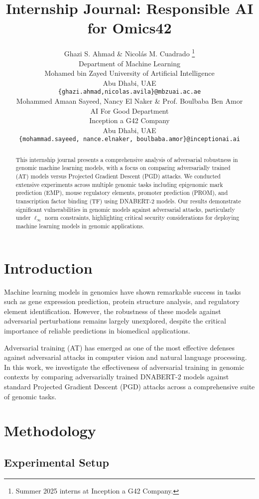 \documentclass{article} %
\title{Internship Journal: Responsible AI for Omics42}
\author{Ghazi S. Ahmad \& Nicolás M. Cuadrado \thanks{Summer 2025 interns at Inception a G42 Company.} \\
    Department of Machine Learning\\
    Mohamed bin Zayed University of Artificial Intelligence\\
    Abu Dhabi, UAE \\
    \texttt{\{ghazi.ahmad,nicolas.avila\}@mbzuai.ac.ae} \\
    \AND
    Mohammed Amaan Sayeed, Nancy El Naker \& Prof. Boulbaba Ben Amor \\
    AI For Good Department\\
    Inception a G42 Company \\
    Abu Dhabi, UAE \\
    \texttt{\{mohammad.sayeed, nance.elnaker, boulbaba.amor\}@inceptionai.ai} \\
    }
\begin{document}
\maketitle

\begin{abstract}
This internship journal presents a comprehensive analysis of adversarial robustness in genomic machine learning models, with a focus on comparing adversarially trained (AT) models versus Projected Gradient Descent (PGD) attacks. We conducted extensive experiments across multiple genomic tasks including epigenomic mark prediction (EMP), mouse regulatory elements, promoter prediction (PROM), and transcription factor binding (TF) using DNABERT-2 models. Our results demonstrate significant vulnerabilities in genomic models against adversarial attacks, particularly under $\ell_\infty$ norm constraints, highlighting critical security considerations for deploying machine learning models in genomic applications.
\end{abstract}

\section{Introduction}

Machine learning models in genomics have shown remarkable success in tasks such as gene expression prediction, protein structure analysis, and regulatory element identification. However, the robustness of these models against adversarial perturbations remains largely unexplored, despite the critical importance of reliable predictions in biomedical applications.

Adversarial training (AT) has emerged as one of the most effective defenses against adversarial attacks in computer vision and natural language processing. In this work, we investigate the effectiveness of adversarial training in genomic contexts by comparing adversarially trained DNABERT-2 models against standard Projected Gradient Descent (PGD) attacks across a comprehensive suite of genomic tasks.

\section{Methodology}

\subsection{Experimental Setup}
\end{document}
